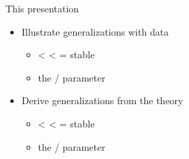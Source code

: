 \documentclass[xcolor=dvipsnames,10pt]{beamer}
\begin{document}
\begin{frame}[t]{This presentation}

\pause

\begin{itemize}
  \item Illustrate generalizations with data
  \begin{itemize}
  \item {} <  <  = stable
  \item the / parameter
  \end{itemize}
  \item Derive generalizations from the theory
  \begin{itemize}
  \item {} <  <  = stable
  \item the / parameter
  \end{itemize}
\end{itemize}

\end{frame}
\end{document}
